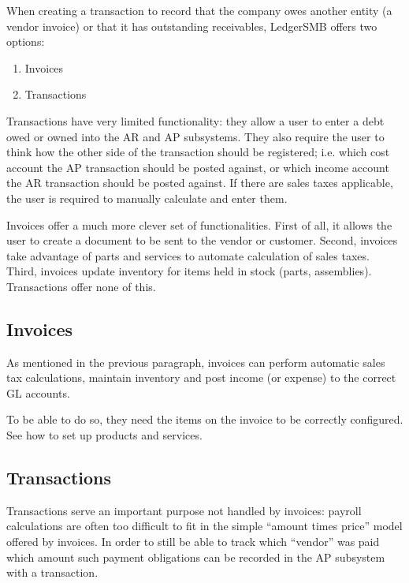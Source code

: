 When creating a transaction to record that the company owes another
entity (a vendor invoice) or that it has outstanding receivables,
LedgerSMB offers two options:

\begin{enumerate}
\item Invoices
\item Transactions
\end{enumerate}

Transactions have very limited functionality: they allow a user to enter
a debt owed or owned into the AR and AP subsystems. They also require the
user to think how the other side of the transaction should be registered;
i.e. which cost account the AP transaction should be posted against, or
which income account the AR transaction should be posted against. If there
are sales taxes applicable, the user is required to manually calculate and
enter them.

Invoices offer a much more clever set of functionalities. First of all, it
allows the user to create a document to be sent to the vendor or customer.
Second, invoices take advantage of parts and services
to automate calculation of sales taxes. Third, invoices update inventory
for items held in stock (parts, assemblies). Transactions offer none of this.

\subsection{Invoices}
\label{subsec:creating-invoices}
As mentioned in the previous paragraph, invoices can perform automatic
sales tax calculations, maintain inventory and post income (or expense)
to the correct GL accounts.

To be able to do so, they need the items on the invoice to be correctly
configured. See  how to set up products
and services.




\subsection{Transactions}

Transactions serve an important purpose not handled by invoices: payroll
calculations are often too difficult to fit in the simple ``amount times price''
model offered by invoices. In order to still be able to track which ``vendor''
was paid which amount such payment obligations can be recorded in the AP subsystem
with a transaction.


